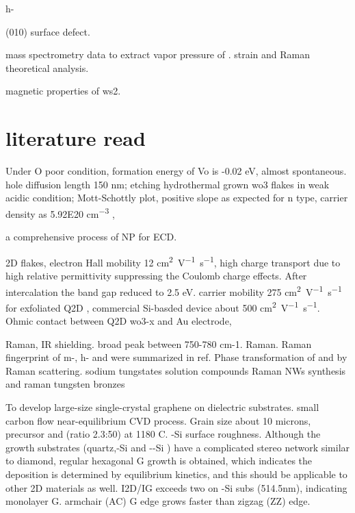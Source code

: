 h- \cite{Lunk2010} \cite{Zheng2009}

 (010) surface defect. \cite{Chen2001}

mass spectrometry data to extract vapor pressure of .
strain and Raman theoretical analysis.\cite{Chang2013a} 

magnetic properties of ws2.\cite{Zhang2013j} 


\section{literature read}

Under O poor condition, formation energy of Vo is -0.02 eV, almost spontaneous.  hole diffusion length 150 nm; etching hydrothermal grown wo3 flakes in weak acidic condition; Mott-Schottly plot, positive slope as expected for n type, carrier density as 5.92E20 \si{cm^{-3}} \cite{Li2014g}, 

a comprehensive process of  NP for ECD. \cite{Wojcik2014}

2D  flakes, electron Hall mobility 12 \si{cm^2V^{-1}s^{-1}}, high charge transport due to high relative permittivity suppressing the Coulomb charge effects. \cite{Zhuiykov2014} After  intercalation the band gap reduced to 2.5 eV. carrier mobility 275 \si{cm^2V^{-1}s^{-1}} for exfoliated Q2D , commercial Si-basded device about 500 \si{cm^2V^{-1}s^{-1}}. Ohmic contact between Q2D wo3-x and Au electrode, 

\cite{Hutter2014}

 Raman, IR shielding.\cite{Guo2012} \cite{Guo2011}
broad peak between 750-780 cm-1.
 Raman. \cite{Knee1979}
Raman fingerprint of m-, h- and  were summarized in ref\cite{Daniel1987}.
Phase transformation of  and  by Raman scattering. \cite{Lima2011}
sodium tungstates solution compounds Raman \cite{Redkin2010}
 NWs synthesis and raman \cite{Ma2005}
tungsten bronzes \cite{Wiseman1976}



To develop large-size single-crystal graphene on dielectric substrates. small carbon flow near-equilibrium CVD process. Grain size about 10 microns, precursor  and  (ratio 2.3:50) at 1180 C. -Si surface roughness. Although the growth substrates (quartz,-Si and --Si ) have a complicated stereo network similar to diamond, regular hexagonal G growth is obtained, which indicates the deposition is determined by equilibrium kinetics, and this should be applicable to other 2D materials as well. I2D/IG exceeds two on -Si subs (514.5nm), indicating monolayer G. armchair (AC) G edge grows faster than zigzag (ZZ) edge.\cite{Chen2013j}

